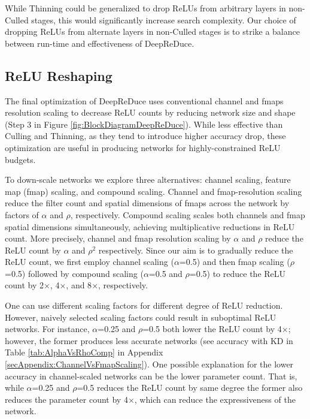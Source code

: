 While Thinning could be generalized to drop ReLUs from arbitrary layers in non-Culled stages, this would significantly increase search complexity. Our choice of dropping ReLUs from alternate layers in non-Culled stages is to strike a balance between run-time and effectiveness of DeepReDuce.




\subsection{ReLU Reshaping}
\label{sec:Reshaping}
The final optimization of DeepReDuce uses conventional channel and fmaps resolution scaling
to decrease ReLU counts by reducing network size and shape 
(Step 3 in Figure \ref{fig:BlockDiagramDeepReDuce}).
While less effective than Culling and Thinning, as they tend to introduce higher accuracy drop, 
these optimization are useful in producing networks for highly-constrained ReLU budgets. 

To down-scale networks we explore three alternatives: 
channel scaling, feature map (fmap) scaling, and compound scaling.
Channel and fmap-resolution scaling reduce the filter count and spatial dimensions of fmaps across the network by factors of $\alpha$ and $\rho$, respectively. 
Compound scaling scales both channels and fmap spatial dimensions simultaneously, achieving multiplicative reductions in ReLU count. 
More precisely, channel and fmap resolution scaling by $\alpha$ and $\rho$ reduce the ReLU count by   $\alpha$ and $\rho^2$ respectively.
Since our aim is to gradually reduce the ReLU count, we first employ channel scaling ($\alpha$=0.5) and then fmap scaling ($\rho$=0.5) followed by compound scaling ($\alpha$=0.5 and $\rho$=0.5) to reduce the ReLU count by 2$\times$, 4$\times$, and 8$\times$, respectively. 

One can use different scaling factors for different degree of ReLU reduction.
However, naively selected scaling factors could result in suboptimal ReLU networks. 
For instance, $\alpha$=0.25 and $\rho$=0.5 both lower the ReLU count by 4$\times$; however, the former produces less accurate networks (see accuracy with KD in Table \ref{tab:AlphaVsRhoComp} in Appendix \ref{secAppendix:ChannelVsFmapScaling}). One possible explanation for the lower accuracy in channel-scaled networks can be the lower parameter count. 
That is, while $\alpha$=0.25 and $\rho$=0.5 reduces the ReLU count by same degree the former also reduces the parameter count by 4$\times$, which can reduce the expressiveness of the network.

